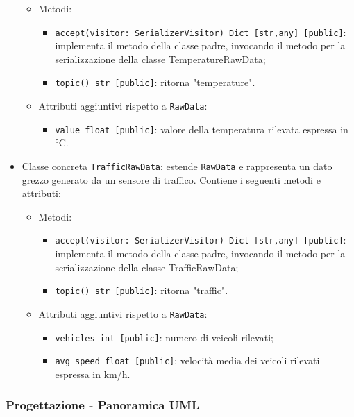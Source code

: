 \begin{itemize}
    \begin{itemize}
        \item Metodi:
        \begin{itemize}
            \item \texttt{accept(visitor: SerializerVisitor) Dict [str,any] [public]}: implementa il metodo della classe padre, invocando il metodo per la serializzazione della classe TemperatureRawData;
            \item \texttt{topic() str [public]}: ritorna "temperature".
        \end{itemize}
        \item Attributi aggiuntivi rispetto a \texttt{RawData}:
        \begin{itemize}
            \item \texttt{value float [public]}: valore della temperatura rilevata espressa in °C.
        \end{itemize}
    \end{itemize}
    \item Classe concreta \texttt{TrafficRawData}: estende \texttt{RawData} e rappresenta un dato grezzo generato da un sensore di traffico. Contiene i seguenti metodi e attributi:
    \begin{itemize}
        \item Metodi:
        \begin{itemize}
            \item \texttt{accept(visitor: SerializerVisitor) Dict [str,any] [public]}: implementa il metodo della classe padre, invocando il metodo per la serializzazione della classe TrafficRawData;
            \item \texttt{topic() str [public]}: ritorna "traffic".
        \end{itemize}
        \item Attributi aggiuntivi rispetto a \texttt{RawData}:
        \begin{itemize}
            \item \texttt{vehicles int [public]}: numero di veicoli rilevati;
            \item \texttt{avg\_speed float [public]}: velocità media dei veicoli rilevati espressa in km/h.
        \end{itemize}
    \end{itemize}
\end{itemize}

\subsubsection{Progettazione - Panoramica UML}


